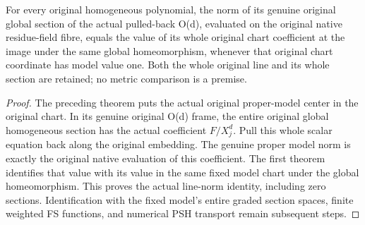 \begin{theorem}
\label{thm:projective-native-model-homogeneous-line-norms}
\leanok
{}
For every original homogeneous polynomial, the norm of its genuine original
global section of the actual pulled-back O(d), evaluated on the original
native residue-field fibre, equals the value of its whole original chart
coefficient at the image under the same global homeomorphism, whenever that
original chart coordinate has model value one. Both the whole original line
and its whole section are retained; no metric comparison is a premise.
\end{theorem}
\begin{proof}
The preceding theorem puts the actual original proper-model center in the
original chart. In its genuine original O(d) frame, the entire original
global homogeneous section has the actual coefficient $F/X_j^d$. Pull this
whole scalar equation back along the original embedding. The genuine proper
model norm is exactly the original native evaluation of this coefficient.
The first theorem identifies that value with its value in the same fixed
model chart under the global homeomorphism. This proves the actual line-norm
identity, including zero sections. Identification with the fixed model's
entire graded section spaces, finite weighted FS functions, and numerical
PSH transport remain subsequent steps.
\end{proof}
